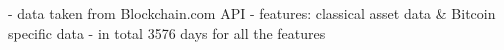 - data taken from Blockchain.com API \cite{Data}
- features: classical asset data \& Bitcoin specific data
- in total 3576 days for all the features